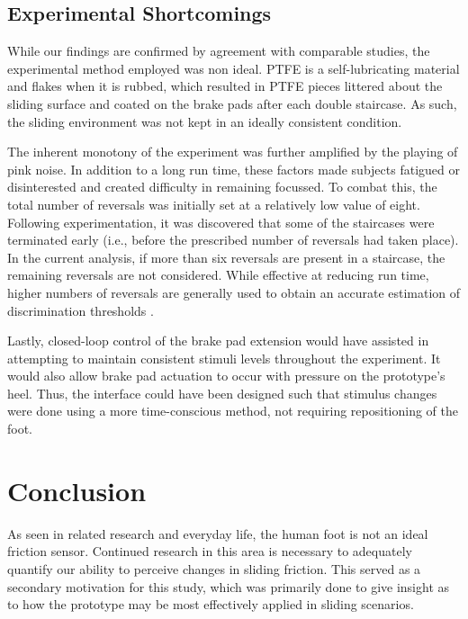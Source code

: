 \documentclass [12pt,letterpaper]{report}
\begin{document}
\subsection{Experimental Shortcomings}

While our findings are confirmed by agreement with comparable studies, the experimental method employed was non ideal. PTFE is a self-lubricating material and flakes when it is rubbed, which resulted in PTFE pieces littered about the sliding surface and coated on the brake pads after each double staircase. As such, the sliding environment was not kept in an ideally consistent condition.

The inherent monotony of the experiment was further amplified by the playing of pink noise. In addition to a long run time, these factors made subjects fatigued or disinterested and created difficulty in remaining focussed. To combat this, the total number of reversals was initially set at a relatively low value of eight. Following experimentation, it was discovered that some of the staircases were terminated early (i.e., before the prescribed number of reversals had taken place). In the current analysis, if more than six reversals are present in a staircase, the remaining reversals are not considered. While effective at reducing run time, higher numbers of reversals are generally used to obtain an accurate estimation of discrimination thresholds \cite{cornsweet1962staircase,levesque2011enhancing}.

Lastly, closed-loop control of the brake pad extension would have assisted in attempting to maintain consistent stimuli levels throughout the experiment. It would also allow brake pad actuation to occur with pressure on the prototype's heel. Thus, the interface could have been designed such that stimulus changes were done using a more time-conscious method, not requiring repositioning of the foot.


\section{Conclusion}

As seen in related research \cite{cohen1994psychophysical} and everyday life, the human foot is not an ideal friction sensor. Continued research in this area is necessary to adequately quantify our ability to perceive changes in sliding friction. This served as a secondary motivation for this study, which was primarily done to give insight as to how the prototype may be most effectively applied in sliding scenarios.
\end{document}

